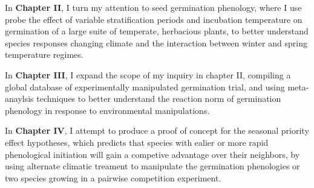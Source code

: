 \documentclass{article}\usepackage[]{graphicx}\usepackage[]{color}
\begin{document}
\par In \textbf{Chapter II}, I turn my attention to seed germination phenology, where I use probe the effect of variable stratification periods and incubation temperature on germination of a large suite of temperate, herbacious plants, to better understand species responses changing climate and the interaction between winter and spring temperature regimes.\\
\par In \textbf{Chapter III}, I expand the scope of my inquiry in chapter II, compiling a global database of experimentally manipulated germination trial, and using meta-anaylsis techniques to better understand the reaction norm of germination phenology in response to environmental manipulations.\\
\par In \textbf{Chapter IV}, I attempt to produce a proof of concept for the seasonal priority effect hypotheses, which predicts that species with ealier or more rapid phenological initiation will gain a competive advantage over their neighbors, by using alternate climatic treament to manipulate the germination phenologies or two species growing in a pairwise competition experiment.\\
\end{document}
